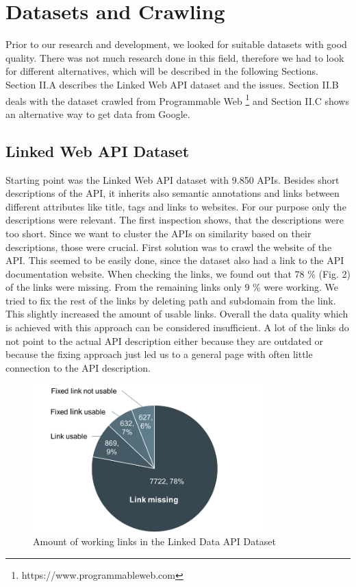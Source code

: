 \documentclass[a4paper]{IEEEtran}
\begin{document}
\section{Datasets and Crawling}
Prior to our research and development, we looked for suitable datasets with good quality. There was not much research done in this field, therefore we had to look for different alternatives, which will be described in the following Sections. Section II.A describes the Linked Web API dataset and the issues. Section II.B deals with the dataset crawled from Programmable Web  \footnote[1]{https://www.programmableweb.com} and Section II.C shows an alternative way to get data from Google.

\subsection{Linked Web API Dataset}
Starting point was the Linked Web API dataset \cite{dojchinovskilinked} with 9.850 APIs. Besides short descriptions of the API, it inherits also semantic annotations and links between different attributes like title, tags and links to websites. For our purpose only the descriptions were relevant. The first inspection shows, that the descriptions were too short. Since we want to cluster the APIs on similarity based on their descriptions, those were crucial. First solution was to crawl the website of the API. This seemed to be easily done, since the dataset also had a link to the API documentation website. When checking the links, we found out that 78 \% (Fig. 2) of the links were missing. From the remaining links only 9 \% were working. We tried to fix the rest of the links by deleting path and subdomain from the link. This slightly increased the amount of usable links. Overall the data quality which is achieved with this approach can be considered insufficient. A lot of the links do not point to the actual API description either because they are outdated or because the fixing approach just led us to a general page with often little connection to the API description.
\begin{figure}[h]
\centering
\includegraphics[width= 3.5in]{img/fig2.png}
\caption{Amount of working links in the Linked Data API Dataset}
\label{fig_sim}
\end{figure}
\end{document}
